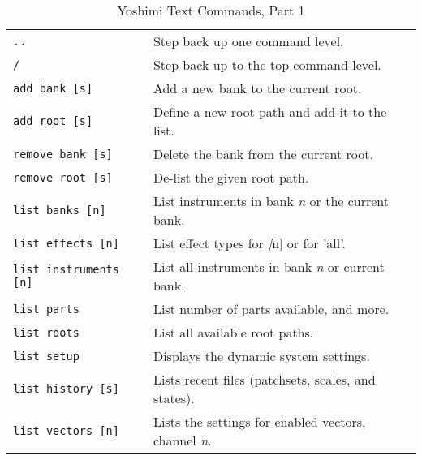    \begin{table}[H]
      \centering
      \caption{Yoshimi Text Commands, Part 1}
      \label{table:yoshimi_text_commands_part_1}
      \begin{tabular}{l l}

         \texttt{..} &
            Step back up one command level. \\

         \texttt{/} &
            Step back up to the top command level. \\

         \texttt{add bank [s]} &
            Add a new bank to the current root. \\

         \texttt{add root [s]} &
            Define a new root path and add it to the list. \\

         \texttt{remove bank [s]} &
            Delete the bank from the current root. \\

         \texttt{remove root [s]} &
            De-list the given root path. \\

         \texttt{list banks [n]} &
            List instruments in bank \textsl{n} or the current bank. \\

         \texttt{list effects [n]} &
            List effect types for \textsl[n] or for 'all'.  \\

         \texttt{list instruments [n]} &
            List all instruments in bank \textsl{n} or current bank. \\

         \texttt{list parts} &
            List number of parts available, and more. \\

         \texttt{list roots} &
            List all available root paths. \\

         \texttt{list setup} &
            Displays the dynamic system settings. \\

         \texttt{list history [s]} &
            Lists recent files (patchsets, scales, and states). \\

         \texttt{list vectors [n]} &
            Lists the settings for enabled vectors, channel \textsl{n}. \\


\end{tabular}
\end{table}
